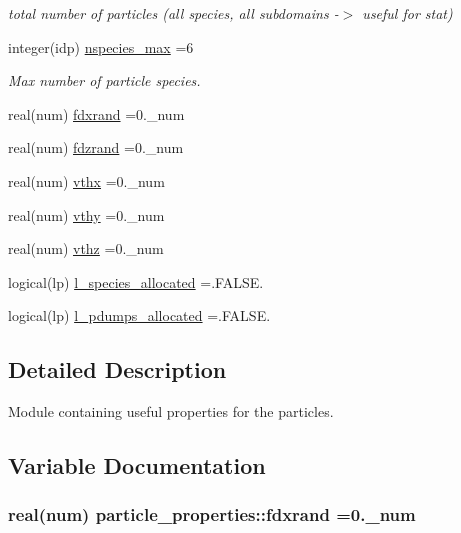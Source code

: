 \begin{DoxyCompactItemize}
\begin{DoxyCompactList}\small\item\em total number of particles (all species, all subdomains -\/$>$ useful for stat) \end{DoxyCompactList}\item 
integer(idp) \hyperlink{namespaceparticle__properties_a7f6d8f4edc23a026743320958d14d534}{nspecies\+\_\+max} =6
\begin{DoxyCompactList}\small\item\em Max number of particle species. \end{DoxyCompactList}\item 
real(num) \hyperlink{namespaceparticle__properties_a68abb05c88189b0d3f2ac02b0bde9d83}{fdxrand} =0.\+\_\+num
\item 
real(num) \hyperlink{namespaceparticle__properties_ac28362a40a4b808ff8ede4d94c4423f3}{fdzrand} =0.\+\_\+num
\item 
real(num) \hyperlink{namespaceparticle__properties_ab09cf3446a6f6d5cc0c600be909db8c1}{vthx} =0.\+\_\+num
\item 
real(num) \hyperlink{namespaceparticle__properties_a6edaa2cc58de2c03d2f9da281f25742a}{vthy} =0.\+\_\+num
\item 
real(num) \hyperlink{namespaceparticle__properties_a7826780fb51369556dcbf7bd63f1ef81}{vthz} =0.\+\_\+num
\item 
logical(lp) \hyperlink{namespaceparticle__properties_a28560b71636b1cc7340564a08847511f}{l\+\_\+species\+\_\+allocated} =.F\+A\+L\+S\+E.
\item 
logical(lp) \hyperlink{namespaceparticle__properties_a7b33d0ccf5fa671ec3287c0243fc4b69}{l\+\_\+pdumps\+\_\+allocated} =.F\+A\+L\+S\+E.
\end{DoxyCompactItemize}


\subsection{Detailed Description}
Module containing useful properties for the particles. 

\subsection{Variable Documentation}
\subsubsection[{\texorpdfstring{fdxrand}{fdxrand}}]{\setlength{\rightskip}{0pt plus 5cm}real(num) particle\+\_\+properties\+::fdxrand =0.\+\_\+num}\hypertarget{namespaceparticle__properties_a68abb05c88189b0d3f2ac02b0bde9d83}{}\label{namespaceparticle__properties_a68abb05c88189b0d3f2ac02b0bde9d83}
